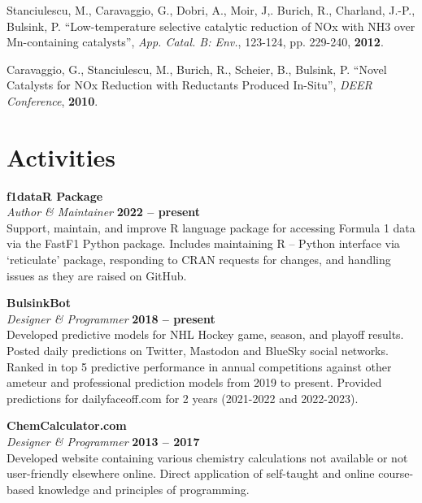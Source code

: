 \documentclass[margin,line]{resume}
\begin{document}
\begin{resume}
	\vspace{0mm}
    Stanciulescu, M., Caravaggio, G., Dobri, A., Moir, J,. Burich, R., Charland, J.-P., Bulsink, P. ``Low-temperature selective catalytic reduction of NOx with NH3 over Mn-containing catalysts'', \textit{App. Catal. B: Env.}, 123-124, pp. 229-240, \textbf{2012}.

	\vspace{0mm}
    Caravaggio, G., Stanciulescu, M., Burich, R., Scheier, B., Bulsink, P. ``Novel Catalysts for NOx Reduction with Reductants Produced In-Situ'', \textit{DEER Conference}, \textbf{2010}.
\vspace{1mm}

    \section{\mysidestyle Activities}

    \textbf{f1dataR Package}\\\vspace{1mm}%
    \textsl{Author \& Maintainer} \hfill \textbf{2022 -- present}\\
    Support, maintain, and improve R language package for accessing Formula 1 data via the FastF1 Python package. 
    Includes maintaining R -- Python interface via `reticulate' package, responding to CRAN requests for changes, and handling issues as they are raised on GitHub.

    \textbf{BulsinkBot}\\\vspace{1mm}%
    \textsl{Designer \& Programmer} \hfill \textbf{2018 -- present}\\
    Developed predictive models for NHL Hockey game, season, and playoff results. 
    Posted daily predictions on Twitter, Mastodon and BlueSky social networks. 
    Ranked in top 5 predictive performance in annual competitions against other ameteur and professional prediction models from 2019 to present. 
    Provided predictions for dailyfaceoff.com for 2 years (2021-2022 and 2022-2023).
    
    \textbf{ChemCalculator.com}\\\vspace{1mm}%
    \textsl{Designer \& Programmer} \hfill \textbf{2013 -- 2017}\\
    Developed website containing various chemistry calculations not available or not user-friendly elsewhere online.
    Direct application of self-taught and online course-based knowledge and principles of programming.


\end{resume}
\end{document}
